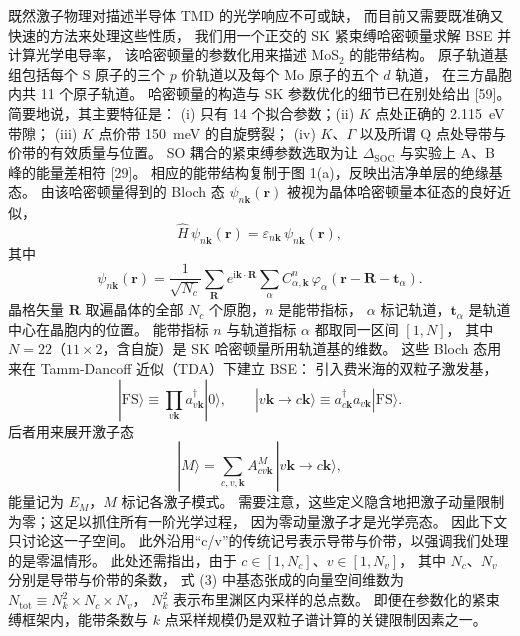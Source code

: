 \documentclass[11pt,a4paper]{ctexart}
\newcommand{\ii}{\mathrm{i}}
\newcommand{\eps}{\varepsilon}
\begin{document}
既然激子物理对描述半导体 TMD 的光学响应不可或缺，
而目前又需要既准确又快速的方法来处理这些性质，
我们用一个正交的 SK 紧束缚哈密顿量求解 BSE 并计算光学电导率，
该哈密顿量的参数化用来描述 MoS$_2$ 的能带结构。
原子轨道基组包括每个 S 原子的三个 $p$ 价轨道以及每个 Mo 原子的五个 $d$ 轨道，
在三方晶胞内共 11 个原子轨道。
哈密顿量的构造与 SK 参数优化的细节已在别处给出 [59]。简要地说，其主要特征是：
(i) 只有 14 个拟合参数；(ii) $K$ 点处正确的 2.115~eV 带隙；
(iii) $K$ 点价带 150~meV 的自旋劈裂；
(iv) $K$、$\Gamma$ 以及所谓 Q 点处导带与价带的有效质量与位置。
SO 耦合的紧束缚参数选取为让 $\Delta_{\mathrm{SOC}}$ 与实验上 A、B 峰的能量差相符 [29]。
相应的能带结构复制于图 1(a)，反映出洁净单层的绝缘基态。
由该哈密顿量得到的 Bloch 态 $\psi_{n\mathbf k}(\mathbf r)$ 被视为晶体哈密顿量本征态的良好近似，
\begin{equation}
\hat H\,\psi_{n\mathbf k}(\mathbf r)=\eps_{n\mathbf k}\,\psi_{n\mathbf k}(\mathbf r),
\end{equation}
其中
\begin{equation}
\psi_{n\mathbf k}(\mathbf r)=\frac{1}{\sqrt{N_c}}\sum_{\mathbf R}e^{\ii\mathbf k\cdot\mathbf R}
\sum_{\alpha}C^{n}_{\alpha,\mathbf k}\,\varphi_{\alpha}(\mathbf r-\mathbf R-\mathbf t_{\alpha}).
\end{equation}
晶格矢量 $\mathbf R$ 取遍晶体的全部 $N_c$ 个原胞，$n$ 是能带指标，
$\alpha$ 标记轨道，$\mathbf t_{\alpha}$ 是轨道中心在晶胞内的位置。
能带指标 $n$ 与轨道指标 $\alpha$ 都取同一区间 $[1,N]$，
其中 $N=22$（$11\times2$，含自旋）是 SK 哈密顿量所用轨道基的维数。
这些 Bloch 态用来在 Tamm-Dancoff 近似（TDA）下建立 BSE：
引入费米海的双粒子激发基，
\begin{equation}
|\mathrm{FS}\rangle\equiv\prod_{v\mathbf k}a^{\dagger}_{v\mathbf k}|0\rangle,
\qquad
|v\mathbf k\to c\mathbf k\rangle\equiv a^{\dagger}_{c\mathbf k}a_{v\mathbf k}|\mathrm{FS}\rangle .
\end{equation}
后者用来展开激子态
\begin{equation}
|M\rangle=\sum_{c,v,\mathbf k}A^{M}_{cv\mathbf k}\,|v\mathbf k\to c\mathbf k\rangle,
\end{equation}
能量记为 $E_M$，$M$ 标记各激子模式。
需要注意，这些定义隐含地把激子动量限制为零；这足以抓住所有一阶光学过程，
因为零动量激子才是光学亮态。
因此下文只讨论这一子空间。
此外沿用“c/v”的传统记号表示导带与价带，以强调我们处理的是零温情形。
此处还需指出，由于 $c\in[1,N_c]$、$v\in[1,N_v]$，
其中 $N_c$、$N_v$ 分别是导带与价带的条数，
式 (3) 中基态张成的向量空间维数为 $N_{\mathrm{tot}}\equiv N_k^2\times N_c\times N_v$，
$N_k^2$ 表示布里渊区内采样的总点数。
即便在参数化的紧束缚框架内，能带条数与 $k$ 点采样规模仍是双粒子谱计算的关键限制因素之一。
\end{document}
